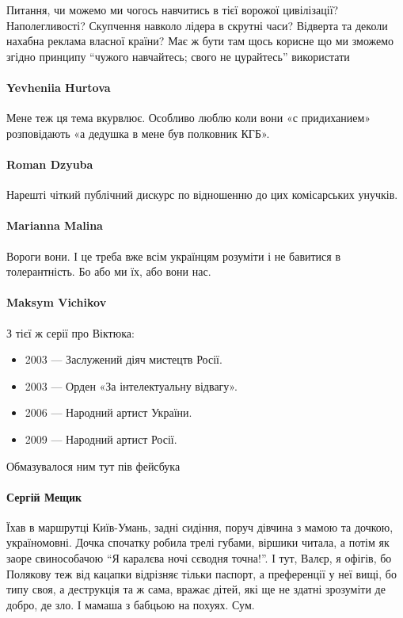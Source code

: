 Питання, чи можемо ми чогось навчитись в тієї ворожої цивілізації?
Наполегливості? Скупчення навколо лідера в скрутні часи? Відверта та деколи
нахабна реклама власної країни? Має ж бути там щось корисне що ми зможемо
згідно принципу \enquote{чужого навчайтесь; свого не цурайтесь} використати

\paragraph{Yevheniia Hurtova}
Мене теж ця тема вкурвлює. Особливо люблю коли вони «с придиханием»
розповідають «а дедушка в мене був полковник КГБ». 

\paragraph{Roman Dzyuba}
Нарешті чіткий публічний дискурс по відношенню до цих комісарських унучків.

\paragraph{Marianna Malina}
Вороги вони. І це треба вже всім українцям розуміти і не бавитися в
толерантність. Бо або ми їх, або вони нас.

\paragraph{Maksym Vichikov}

З тієї ж серії про Віктюка:
\begin{itemize}
  \item 2003 — Заслужений діяч мистецтв Росії.
  \item 2003 — Орден «За інтелектуальну відвагу».
  \item 2006 — Народний артист України.
  \item 2009 — Народний артист Росії.
\end{itemize}
Обмазувалося ним тут пів фейсбука

\paragraph{Сергій Мещик}

Їхав в маршрутці Київ-Умань, задні сидіння, поруч дівчина з мамою та дочкою,
україномовні. Дочка спочатку робила трелі губами, віршики читала, а потім як
заоре свинособачою \enquote{Я каралєва ночі сєводня точна!}. І тут, Валєр, я офігів, бо
Полякову теж від кацапки відрізняє тільки паспорт, а преференції у неї вищі, бо
типу своя, а деструкція та ж сама, вражає дітей, які ще не здатні зрозуміти де
добро, де зло. І мамаша з бабцьою на похуях. Сум.

